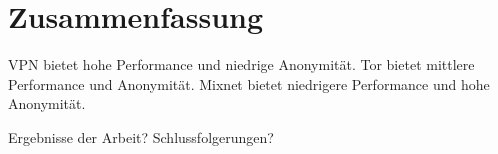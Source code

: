 \section{Zusammenfassung}

VPN bietet hohe Performance und niedrige Anonymität.
Tor bietet mittlere Performance und Anonymität.
Mixnet bietet niedrigere Performance und hohe Anonymität.

Ergebnisse der Arbeit? Schlussfolgerungen?
